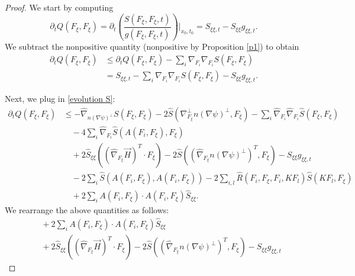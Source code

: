 \documentclass[12pt,letterpaper]{amsart}%
\numberwithin{mycounter}{section}
\theoremstyle{plain}
\numberwithin{equation}{section}
\theoremstyle{definition}
\newcommand{\maxidx}{\mathord{\xi}} %
\begin{document}
\begin{proof}
We start by computing
\[
\partial_{t}Q(F_{\maxidx},F_{\maxidx})=\partial_{t}\left(  \frac{S(F_{\maxidx},F_{\maxidx},t)}%
{g(F_{\maxidx},F_{\maxidx},t)}\right)  \Big|_{x_{0},t_{0}}=S_{\maxidx\maxidx,t}-S_{\maxidx\maxidx}g_{\maxidx\maxidx,t}.
\]
We subtract the {nonpositive} quantity (nonpositive by Proposition \ref{p1}) to obtain
\begin{align*}
\partial_{t}Q(F_{\maxidx},F_{\maxidx})  & \leq\partial_{t}Q(F_{\maxidx},F_{\maxidx})-\sum_{i}%
\nabla_{F_{i}}\nabla_{F_{i}}S(F_{\maxidx},F_{\maxidx})\\
&  =S_{\maxidx\maxidx,t}-\sum_{i}\nabla_{F_{i}}\nabla_{F_{i}}S(F_{\maxidx},F_{\maxidx})-S_{\maxidx\maxidx}%
g_{\maxidx\maxidx,t}.
\end{align*}

Next, we plug in \eqref{evolution S}:
\begin{align*}
\partial_{t}Q(F_{\maxidx},F_{\maxidx})
& \leq -\hat{\nabla}_{n\left( \nabla\psi\right)^{\perp}}
      S(F_{\maxidx},F_{\maxidx})
      -2\hat{S}\left( \nabla_{F_{\maxidx}}^{\perp} n\left(\nabla\psi\right)^{\perp},
      F_{\maxidx}\right)
      -\sum_{i}\hat{\nabla}_{F_{i}}\hat{\nabla}_{F_{i}}
      \hat{S}(F_{\maxidx},F_{\maxidx})\\
& \quad -4\sum_{i}\hat{\nabla}_{F_{i}}
      \hat{S}(A(F_{i},F_{\maxidx}),F_{\maxidx})\\
& \quad +2\hat{S}_{\maxidx\maxidx}\left(
        (\hat{\nabla}_{F_{\maxidx}}\vec{H})^{T}\cdot F_{\maxidx}\right)
      -2\hat{S}\left(
        (\hat{\nabla}_{F_{\maxidx}}n\left( \nabla\psi\right)^{\perp})^{T},
        F_{\maxidx}\right)
      -S_{\maxidx\maxidx} g_{\maxidx\maxidx,t}\\
& \quad -2\sum_{i}\hat{S}(A(F_{i},F_{\maxidx}),A(F_{i},F_{\maxidx}))
      -2\sum_{i,l}\hat{R}(F_{i},F_{\maxidx},F_{i},KF_{l})
         \hat{S}(KF_{l},F_{\maxidx})\\
& \quad +2\sum_{i}
      A(F_{i},F_{\maxidx})\cdot A(F_{i},F_{\maxidx})\hat{S}_{\maxidx\maxidx}.
\end{align*}
We rearrange the above quantities as follows:\begin{align*}
&\quad +2\sum_{i}A(F_{i},F_{\maxidx})\cdot A(F_{i},F_{\maxidx})\hat{S}_{\maxidx\maxidx}
\tag{1}\label{eq:L1}\\
&\quad +2\hat{S}_{\maxidx\maxidx}\left( (\hat{\nabla}_{F_{\maxidx}}\vec{H})^{T}\cdot F_{\maxidx}\right)
   -2\hat{S}\left( (\hat{\nabla}_{F_{\maxidx}}n(\nabla\psi)^{\perp})^{T},F_{\maxidx}\right)
   -S_{\maxidx\maxidx}g_{\maxidx\maxidx,t}

\end{align*}
\end{proof}
\end{document}
